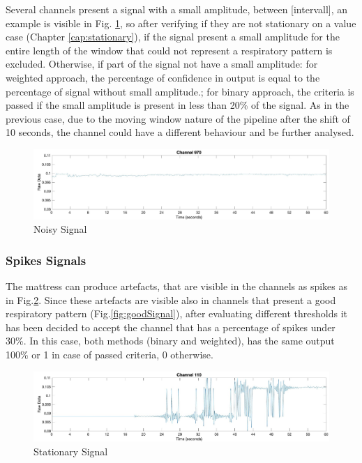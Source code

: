 Several channels present a signal with a small amplitude, between [intervall], an example is visible in Fig. \ref{fig:noisy}, so after verifying if they are not stationary on a value case (Chapter \ref{cap:stationary}), if the signal present a small amplitude for the entire length of the window that could not represent a respiratory pattern is excluded. 
Otherwise, if part of the signal not have a small amplitude: for weighted approach, the percentage of confidence in output is equal to the percentage of signal without small amplitude.; for binary approach, the criteria is passed if the small amplitude is present in less than 20\% of the signal.
As in the previous case, due to the moving window nature of the pipeline after the shift of 10 seconds, the channel could have a different behaviour and be further analysed.\\


\begin{figure}[H]
    \centering
    \includegraphics[width=\textwidth]{img/noisy.jpg}
    \caption{Noisy Signal}
    \label{fig:noisy}
\end{figure}


\subsubsection{Spikes Signals} \label{spikes}
The mattress can produce artefacts, that are visible in the channels as spikes as in Fig.\ref{fig:spikeTotal}. 
Since these artefacts are visible also in channels that present a good respiratory pattern (Fig.\ref{fig:goodSignal}), after evaluating different thresholds it has been decided to accept the channel that has a percentage of spikes under 30\%. In this case, both methods (binary and weighted), has the same output 100\% or 1 in case of passed criteria, 0 otherwise.\\


\begin{figure}[H]
    \centering
    \includegraphics[width=\textwidth]{img/spike_total.jpg}
    \caption{Stationary Signal}
    \label{fig:spikeTotal}
\end{figure}

